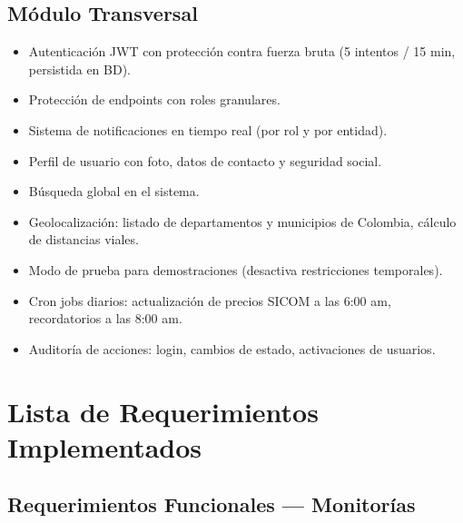 \documentclass[12pt,a4paper]{article}
\begin{document}
\subsection{Módulo Transversal}
\begin{itemize}[leftmargin=1.5cm]
  \item Autenticación JWT con protección contra fuerza bruta (5 intentos / 15 min, persistida en BD).
  \item Protección de endpoints con roles granulares.
  \item Sistema de notificaciones en tiempo real (por rol y por entidad).
  \item Perfil de usuario con foto, datos de contacto y seguridad social.
  \item Búsqueda global en el sistema.
  \item Geolocalización: listado de departamentos y municipios de Colombia, cálculo de distancias viales.
  \item Modo de prueba para demostraciones (desactiva restricciones temporales).
  \item Cron jobs diarios: actualización de precios SICOM a las 6:00 am, recordatorios a las 8:00 am.
  \item Auditoría de acciones: login, cambios de estado, activaciones de usuarios.
\end{itemize}

\newpage
\section{Lista de Requerimientos Implementados}

\subsection{Requerimientos Funcionales — Monitorías}
\end{document}
